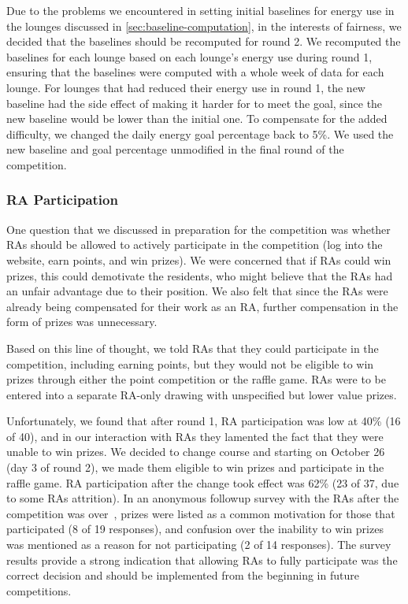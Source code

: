 Due to the problems we encountered in setting initial baselines for energy use in the lounges discussed in \autoref{sec:baseline-computation}, in the interests of fairness, we decided that the baselines should be recomputed for round 2. We recomputed the baselines for each lounge based on each lounge's energy use during round 1, ensuring that the baselines were computed with a whole week of data for each lounge. For lounges that had reduced their energy use in round 1, the new baseline had the side effect of making it harder for to meet the goal, since the new baseline would be lower than the initial one. To compensate for the added difficulty, we changed the daily energy goal percentage back to 5\%. We used the new baseline and goal percentage unmodified in the final round of the competition.


\subsubsection{RA Participation}
\label{sec:ra-participation}

One question that we discussed in preparation for the competition was whether RAs should be allowed to actively participate in the competition (log into the website, earn points, and win prizes). We were concerned that if RAs could win prizes, this could demotivate the residents, who might believe that the RAs had an unfair advantage due to their position. We also felt that since the RAs were already being compensated for their work as an RA, further compensation in the form of prizes was unnecessary.

Based on this line of thought, we told RAs that they could participate in the competition, including earning points, but they would not be eligible to win prizes through either the point competition or the raffle game. RAs were to be entered into a separate RA-only drawing with unspecified but lower value prizes. 

Unfortunately, we found that after round 1, RA participation was low at 40\% (16 of 40), and in our interaction with RAs they lamented the fact that they were unable to win prizes. We decided to change course and starting on October 26 (day 3 of round 2), we made them eligible to win prizes and participate in the raffle game. RA participation after the change took effect was 62\% (23 of 37, due to some RAs attrition). In an anonymous followup survey with the RAs after the competition was over~\cite{csdl2-11-08}, prizes were listed as a common motivation for those that participated (8 of 19 responses), and confusion over the inability to win prizes was mentioned as a reason for not participating (2 of 14 responses). The survey results provide a strong indication that allowing RAs to fully participate was the correct decision and should be implemented from the beginning in future competitions.


